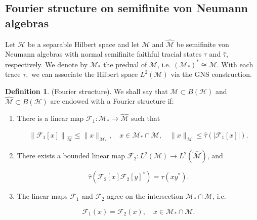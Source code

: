 \documentclass[a4paper,12pt]{amsart}
\numberwithin{equation}{section}
\theoremstyle{definition}
\newtheorem{defn}[thm]{Definition}
\begin{document}
\subsection{Fourier structure on semifinite von Neumann algebras}
Let $\mathcal{H}$ be a separable Hilbert space and let $\mathcal{M}$ and $\widehat{\mathcal{M}}$ be semifinite von Neumann algebras with normal semifinite faithful tracial states $\tau$ and $\widehat{\tau},$ respectively.
 We denote by $\mathcal{M}_{*}$ the predual of $\mathcal{M}$, i.e. $\left(\mathcal{M}_{*}\right)^{*} \cong \mathcal{M}$. With each trace $\tau,$ we can associate the Hilbert space $L^{2}(\mathcal{M})$ via the GNS construction.

\begin{defn}\label{Fourier-structure}(Fourier structure). We shall say that $\mathcal{M} \subset B(\mathcal{H})$ and $\widehat{\mathcal{M}} \subset B(\mathcal{H})$ are endowed with a Fourier structure if:
\begin{enumerate}[{\rm (F1)}]
\item  There is a linear map $\mathcal{F}_{1}: \mathcal{M}_{*} \rightarrow \widehat{\mathcal{M}}$ such that

\[
\begin{array}{r}
\left\|\mathcal{F}_{1}[x]\right\|_{\widehat{\mathcal{M}}} \leq\|x\|_{\mathcal{M}_{*}}, \quad x \in \mathcal{M}_{*} \cap \mathcal{M}, 
\quad \|x\|_{\mathcal{M}} \leq \widehat{\tau}\left(\left|\mathcal{F}_{1}[x]\right|\right).
\end{array}
\]

\item  There exists a bounded linear map $\mathcal{F}_{2}: L^{2}(\mathcal{M}) \rightarrow L^{2}(\widehat{\mathcal{M}})$, and


\begin{equation*}
\widehat{\tau}\left(\mathcal{F}_{2}[x] \mathcal{F}_{2}[y]^{*}\right)=\tau\left(x y^{*}\right).
\end{equation*}


\item  The linear maps $\mathcal{F}_{1}$ and $\mathcal{F}_{2}$ agree on the intersection $\mathcal{M}_{*} \cap \mathcal{M}$, i.e.


\begin{equation*}
\mathcal{F}_{1}(x)=\mathcal{F}_{2}(x), \quad x \in \mathcal{M}_{*} \cap \mathcal{M}.
\end{equation*}
\end{enumerate}
\item 
\end{defn} 
\end{document}
